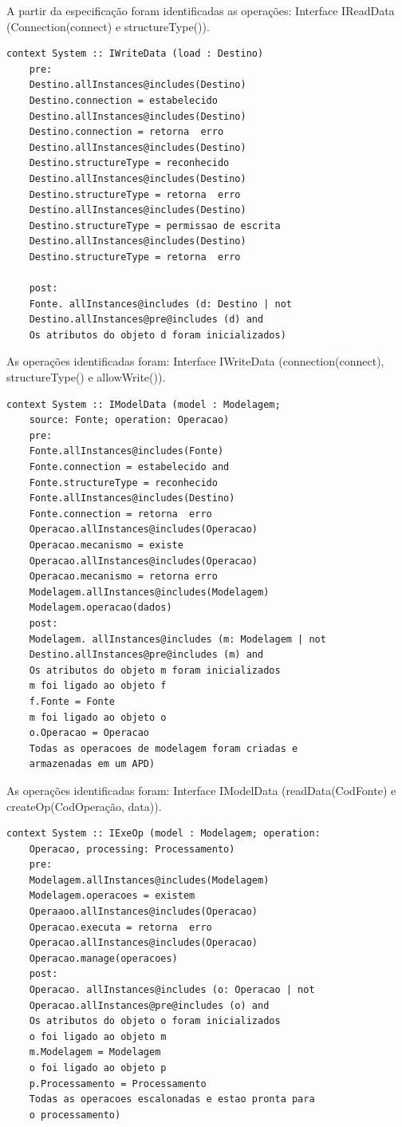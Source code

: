 A partir da especificação foram identificadas as operações: Interface IReadData (Connection(connect) e structureType()).

\begin{lstlisting}[frame=single, language=Oberon-2, basicstyle=\small]
	context System :: IWriteData (load : Destino)
	pre:
	Destino.allInstances@includes(Destino) 
	Destino.connection = estabelecido
	Destino.allInstances@includes(Destino) 
	Destino.connection = retorna  erro
	Destino.allInstances@includes(Destino)
	Destino.structureType = reconhecido
	Destino.allInstances@includes(Destino)
	Destino.structureType = retorna  erro
	Destino.allInstances@includes(Destino) 
	Destino.structureType = permissao de escrita
	Destino.allInstances@includes(Destino)
	Destino.structureType = retorna  erro

	post:
	Fonte. allInstances@includes (d: Destino | not 
	Destino.allInstances@pre@includes (d) and
	Os atributos do objeto d foram inicializados)
\end{lstlisting}

As operações identificadas foram: Interface IWriteData (connection(connect), structureType() e allowWrite()).

\begin{lstlisting}[frame=single, language=Oberon-2, basicstyle=\small]
	context System :: IModelData (model : Modelagem; 
	source: Fonte; operation: Operacao)
	pre:
	Fonte.allInstances@includes(Fonte) 
	Fonte.connection = estabelecido and  
	Fonte.structureType = reconhecido	
	Fonte.allInstances@includes(Destino) 
	Fonte.connection = retorna  erro	
	Operacao.allInstances@includes(Operacao) 
	Operacao.mecanismo = existe	
	Operacao.allInstances@includes(Operacao) 
	Operacao.mecanismo = retorna erro	
	Modelagem.allInstances@includes(Modelagem) 
	Modelagem.operacao(dados)	
	post:	
	Modelagem. allInstances@includes (m: Modelagem | not 
	Destino.allInstances@pre@includes (m) and
	Os atributos do objeto m foram inicializados
	m foi ligado ao objeto f
	f.Fonte = Fonte
	m foi ligado ao objeto o
	o.Operacao = Operacao
	Todas as operacoes de modelagem foram criadas e 
	armazenadas em um APD)
\end{lstlisting}

As operações identificadas foram: Interface IModelData (readData(CodFonte) e createOp(CodOperação, data)).

\begin{lstlisting}[frame=single, language=Oberon-2, basicstyle=\small]
	context System :: IExeOp (model : Modelagem; operation: 
	Operacao, processing: Processamento)
	pre:
	Modelagem.allInstances@includes(Modelagem) 
	Modelagem.operacoes = existem 
	Operaaoo.allInstances@includes(Operacao) 
	Operacao.executa = retorna  erro	
	Operacao.allInstances@includes(Operacao) 
	Operacao.manage(operacoes)	
	post:
	Operacao. allInstances@includes (o: Operacao | not 
	Operacao.allInstances@pre@includes (o) and	
	Os atributos do objeto o foram inicializados
	o foi ligado ao objeto m
	m.Modelagem = Modelagem
	o foi ligado ao objeto p
	p.Processamento = Processamento
	Todas as operacoes escalonadas e estao pronta para 
	o processamento)

\end{lstlisting}


